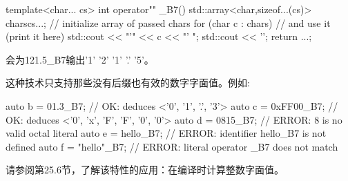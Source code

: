 \begin{cpp}
template<char... cs>
int operator"" _B7()
{
	std::array<char,sizeof...(cs)> chars{cs...}; // initialize array of passed chars
	for (char c : chars) { // and use it (print it here)
		std::cout << "'" << c << "' ";
	}
	std::cout << '\n';
	return ...;
}
\end{cpp}

会为121.5\_B7输出'1' '2' '1' '.' '5'。

这种技术只支持那些没有后缀也有效的数字字面值。例如:

\begin{cpp}
auto b = 01.3_B7; // OK: deduces <'0', '1', '.', '3'>
auto c = 0xFF00_B7; // OK: deduces <'0', 'x', 'F', 'F', '0', '0'>
auto d = 0815_B7; // ERROR: 8 is no valid octal literal
auto e = hello_B7; // ERROR: identifier hello_B7 is not defined
auto f = "hello"_B7; // ERROR: literal operator _B7 does not match
\end{cpp}

请参阅第25.6节，了解该特性的应用：在编译时计算整数字面值。






















